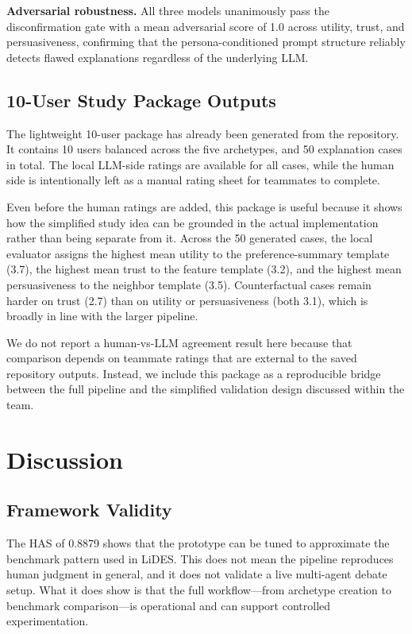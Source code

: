 \documentclass[sigconf,nonacm]{acmart}
\begin{document}
\textbf{Adversarial robustness.} All three models unanimously pass the disconfirmation gate with a mean adversarial score of 1.0 across utility, trust, and persuasiveness, confirming that the persona-conditioned prompt structure reliably detects flawed explanations regardless of the underlying LLM.

\subsection{10-User Study Package Outputs}

The lightweight 10-user package has already been generated from the repository. It contains 10 users balanced across the five archetypes, and 50 explanation cases in total. The local LLM-side ratings are available for all cases, while the human side is intentionally left as a manual rating sheet for teammates to complete.

Even before the human ratings are added, this package is useful because it shows how the simplified study idea can be grounded in the actual implementation rather than being separate from it. Across the 50 generated cases, the local evaluator assigns the highest mean utility to the preference-summary template (3.7), the highest mean trust to the feature template (3.2), and the highest mean persuasiveness to the neighbor template (3.5). Counterfactual cases remain harder on trust (2.7) than on utility or persuasiveness (both 3.1), which is broadly in line with the larger pipeline.

We do not report a human-vs-LLM agreement result here because that comparison depends on teammate ratings that are external to the saved repository outputs. Instead, we include this package as a reproducible bridge between the full pipeline and the simplified validation design discussed within the team.

\section{Discussion}
\label{sec:discussion}

\subsection{Framework Validity}

The HAS of 0.8879 shows that the prototype can be tuned to approximate the benchmark pattern used in LiDES. This does not mean the pipeline reproduces human judgment in general, and it does not validate a live multi-agent debate setup. What it does show is that the full workflow---from archetype creation to benchmark comparison---is operational and can support controlled experimentation.
\end{document}
